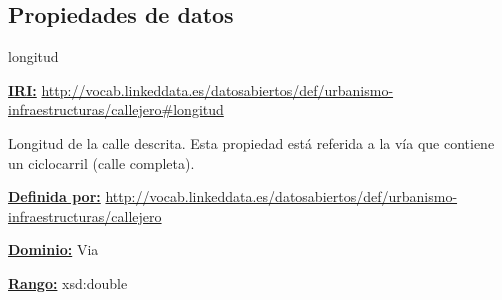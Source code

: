 \subsection{Propiedades de datos}


\begin{mybox}{longitud}
\begin{flushleft}
\underline{\textbf{IRI:}}
\url{http://vocab.linkeddata.es/datosabiertos/def/urbanismo-infraestructuras/callejero#longitud}
\newline

Longitud de la calle descrita. Esta propiedad está referida a la vía que contiene un ciclocarril (calle completa).
\newline

\underline{\textbf{Definida por:}}\newline
\url{http://vocab.linkeddata.es/datosabiertos/def/urbanismo-infraestructuras/callejero}
\newline

\underline{\textbf{Dominio:}}
	Via
\newline

\underline{\textbf{Rango:}}
		xsd:double
\newline

\end{flushleft}
\end{mybox}



